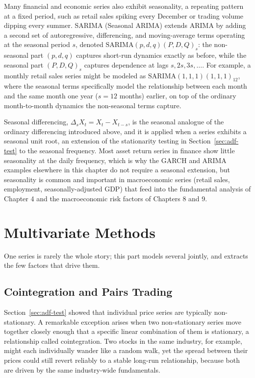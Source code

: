 \documentclass[../ai_in_finance]{subfiles}
\begin{document}
Many financial and economic series also exhibit seasonality, a repeating pattern at a fixed period, such as retail sales spiking every December or trading
volume dipping every summer. SARIMA (Seasonal ARIMA) extends ARIMA by adding a second set of autoregressive, differencing, and
moving-average terms operating at the seasonal period $s$, denoted $\text{SARIMA}(p,d,q)(P,D,Q)_s$: the non-seasonal part $(p,d,q)$ captures short-run
dynamics exactly as before, while the seasonal part $(P,D,Q)_s$ captures dependence at lags $s, 2s, 3s, \ldots$. For example, a monthly retail sales
series might be modeled as $\text{SARIMA}(1,1,1)(1,1,1)_{12}$, where the seasonal terms specifically model the relationship between each month and
the same month one year ($s=12$ months) earlier, on top of the ordinary month-to-month dynamics the non-seasonal terms capture.

Seasonal differencing, $\Delta_s X_t = X_t - X_{t-s}$, is the seasonal analogue of the ordinary differencing introduced above, and it is applied when a series
exhibits a seasonal unit root, an extension of the stationarity testing in Section~\ref{sec:adf-test} to the seasonal frequency. Most asset return series in
finance show little seasonality at the daily frequency, which is why the GARCH and ARIMA examples elsewhere in this chapter do not require a seasonal extension,
but seasonality is common and important in macroeconomic series (retail sales, employment, seasonally-adjusted GDP) that feed into the fundamental analysis of
 Chapter 4 and the macroeconomic risk factors of Chapters 8 and 9.

\section{Multivariate Methods}

One series is rarely the whole story; this part models several jointly, and extracts the few factors that drive them.

\subsection{Cointegration and Pairs Trading}
\label{sec:cointegration}

Section~\ref{sec:adf-test} showed that individual price series are typically non-stationary. A remarkable exception arises when two non-stationary series move together closely enough that a specific linear combination of them is stationary, a relationship called cointegration. Two stocks in the same industry, for example, might each individually wander like a random walk, yet the spread between their prices could still revert reliably to a stable long-run relationship, because both are driven by the same industry-wide fundamentals.
\end{document}
